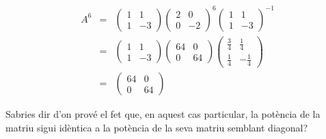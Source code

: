 \begin{eqnarray*}
A^6 &=&\begin{pmatrix}1&1\\1&-3\end{pmatrix}\begin{pmatrix}2&0\\0&-2\end{pmatrix}^6\begin{pmatrix}1&1\\1&-3\end{pmatrix}^{-1}\\
&=&\begin{pmatrix}1&1\\1&-3\end{pmatrix}\begin{pmatrix}64&0\\0&64\end{pmatrix}\begin{pmatrix}\frac{3}{4}&\frac{1}{4}\\\frac{1}{4}&-\frac{1}{4}\end{pmatrix}\\
&=&\begin{pmatrix}64&0\\0&64\end{pmatrix}
\end{eqnarray*}

Sabries dir d'on prové el fet que, en aquest cas particular, la potència de la matriu sigui idèntica a la potència de la seva matriu semblant diagonal?




\blacksquare
